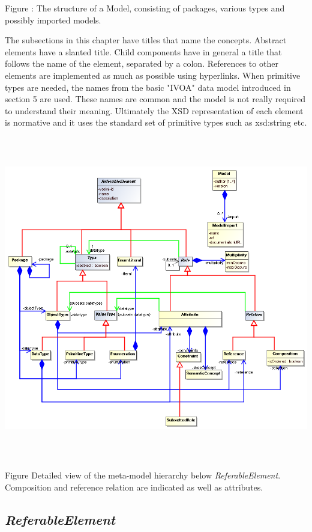 \documentclass[10pt,a4paper]{ivoa}
\begin{document}
Figure : The structure of a Model, consisting of packages, various types
and possibly imported models.

The subsections in this chapter have titles that name the concepts.
Abstract elements have a slanted title. Child components have in general
a title that follows the name of the element, separated by a colon.
References to other elements are implemented as much as possible using
hyperlinks. When primitive types are needed, the names from the basic
"IVOA" data model introduced in section 5 are used. These names are
common and the model is not really required to understand their meaning.
Ultimately the XSD representation of each element is normative and it
uses the standard set of primitive types such as xsd:string etc.

\includegraphics[width=6.42681in,height=5.57037in]{./media/image6.png}

Figure Detailed view of the meta-model hierarchy below
\emph{ReferableElement}. Composition and reference relation are
indicated as well as attributes.

\hypertarget{referableelement}{%
\subsection{\texorpdfstring{\emph{ReferableElement}
}{ReferableElement }}\label{referableelement}}
\end{document}
